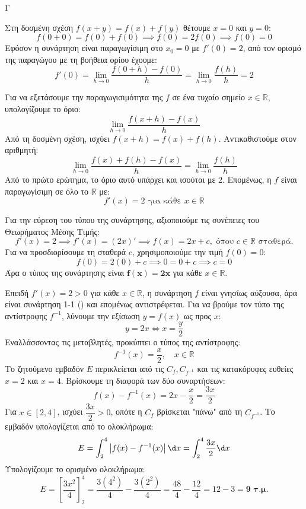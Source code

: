 \begin{thema}{Γ}
\begin{erwthma}
  \item 
  Στη δοσμένη σχέση $f(x+y) = f(x) + f(y)$ θέτουμε $x=0$ και $y=0$:
  \[ f(0+0) = f(0) + f(0) \implies f(0) = 2f(0) \implies f(0) = 0 \]
  Εφόσον η συνάρτηση είναι παραγωγίσιμη στο $x_0=0$ με $f'(0)=2$, από τον ορισμό της παραγώγου με τη βοήθεια ορίου έχουμε:
  \[ f'(0) = \lim_{h \to 0} \frac{f(0+h) - f(0)}{h}=\lim_{h \to 0} \frac{f(h)}{h} = 2 \]
  \item 
  Για να εξετάσουμε την παραγωγισιμότητα της $f$ σε ένα τυχαίο σημείο $x \in \mathbb{R}$, υπολογίζουμε το όριο:
  \[ \lim_{h \to 0} \frac{f(x+h) - f(x)}{h} \]
  Από τη δοσμένη σχέση, ισχύει $f(x+h) = f(x) + f(h)$. Αντικαθιστούμε στον αριθμητή:
  \[ \lim_{h \to 0} \frac{f(x) + f(h) - f(x)}{h} = \lim_{h \to 0} \frac{f(h)}{h} \]
  Από το πρώτο ερώτημα, το όριο αυτό υπάρχει και ισούται με 2.
  Επομένως, η $f$ είναι παραγωγίσιμη σε όλο το $\mathbb{R}$ με:
  \[ f'(x) = 2 \text{ για κάθε } x \in \mathbb{R} \]
  
  Για την εύρεση του τύπου της συνάρτησης, αξιοποιούμε τις συνέπειες του Θεωρήματος Μέσης Τιμής:
  \[ f'(x) = 2 \implies f'(x) = (2x)' \implies f(x) = 2x + c, \text{ όπου } c \in \mathbb{R} \text{ σταθερά.} \]
  Για να προσδιορίσουμε τη σταθερά $c$, χρησιμοποιούμε την τιμή $f(0) = 0$:
  \[ f(0) = 2(0) + c \implies 0 = 0 + c \implies c = 0 \]
  Άρα ο τύπος της συνάρτησης είναι $\boldsymbol{f(x) = 2x}$ για κάθε $x \in \mathbb{R}$.

  \item 
  Επειδή $f'(x) = 2 > 0$ για κάθε $x \in \mathbb{R}$, η συνάρτηση $f$ είναι γνησίως αύξουσα, άρα είναι συνάρτηση 1-1 () και επομένως αντιστρέφεται.
  Για να βρούμε τον τύπο της αντίστροφης $f^{-1}$, λύνουμε την εξίσωση $y = f(x)$ ως προς $x$:
  \[ y = 2x \Leftrightarrow x = \frac{y}{2} \]
  Εναλλάσσοντας τις μεταβλητές, προκύπτει ο τύπος της αντίστροφης:
  \[ f^{-1}(x) = \frac{x}{2}, \quad x \in \mathbb{R} \]
  Το ζητούμενο εμβαδόν $E$ περικλείεται από τις $C_f, C_{f^{-1}}$ και τις κατακόρυφες ευθείες $x=2$ και $x=4$.
  Βρίσκουμε τη διαφορά των δύο συναρτήσεων:
  \[ f(x) - f^{-1}(x) = 2x - \frac{x}{2} = \frac{3x}{2} \]
  Για $x \in [2, 4]$, ισχύει $\dfrac{3x}{2} > 0$, οπότε η $C_f$ βρίσκεται "πάνω" από τη $C_{f^{-1}}$. Το εμβαδόν υπολογίζεται από το ολοκλήρωμα:
  \[ E = \int_{2}^{4} \left| f(x) - f^{-1}(x) \right| \d x = \int_{2}^{4} \frac{3x}{2} \d x \]
  Υπολογίζουμε το ορισμένο ολοκλήρωμα:
  \[ E = \left[ \frac{3x^2}{4} \right]_{2}^{4} = \frac{3(4^2)}{4} - \frac{3(2^2)}{4} = \frac{48}{4} - \frac{12}{4} = 12 - 3 = \boldsymbol{9 \text{ τ.μ.}} \]
\end{erwthma}
\end{thema}
